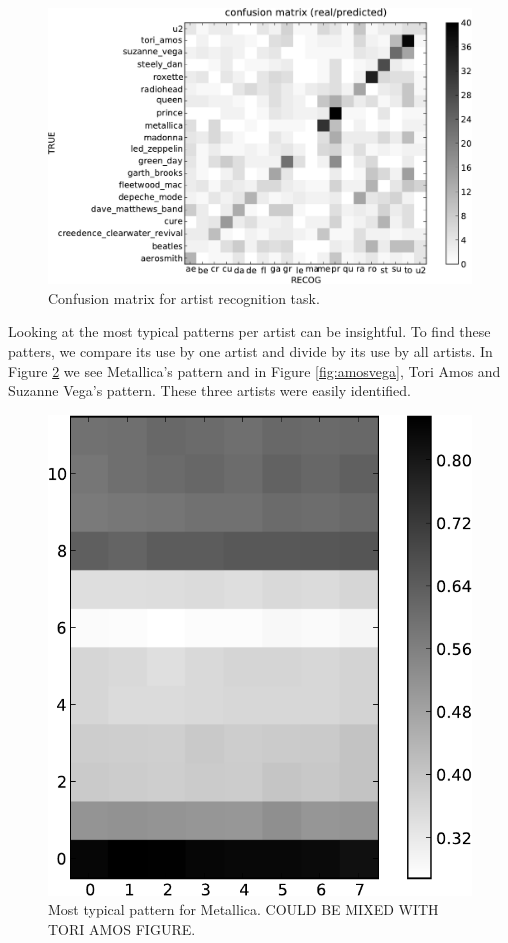 \documentclass{article}
\begin{document}
\begin{figure}[htb]
\begin{center}
\includegraphics[width=.9\columnwidth]{conf_mat_per_artist}
\end{center}
\caption{\small{Confusion matrix for artist recognition task.}}
\label{fig:conf_mat}
\end{figure}

Looking at the most typical patterns per artist can be insightful.
To find these patters, we compare its use by one artist and divide
by its use by all artists. In Figure \ref{fig:metallica} we see 
Metallica's pattern and in Figure \ref{fig:amosvega}, Tori Amos and
Suzanne Vega's pattern. These three artists were easily identified.

\begin{figure}[htb]
\begin{center}
\includegraphics[width=.4\columnwidth]{metallica_pattern}
\end{center}
\caption{\small{Most typical pattern for Metallica.
COULD BE MIXED WITH TORI AMOS FIGURE.
}}
\label{fig:metallica}
\end{figure}
\end{document}
